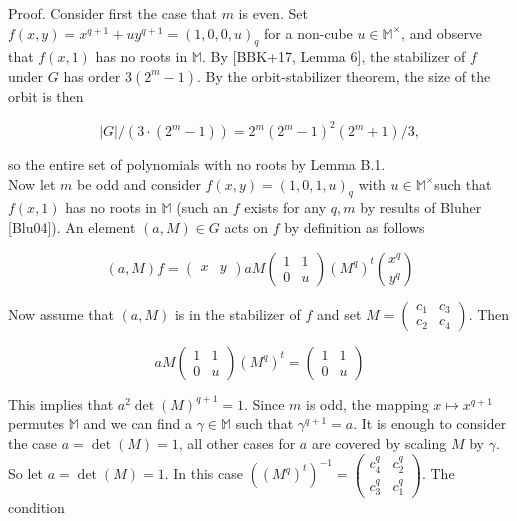 \documentclass[10pt]{article}
\begin{document}
Proof. Consider first the case that $m$ is even. Set $f(x, y)=x^{q+1}+u y^{q+1}=(1,0,0, u)_{q}$ for a non-cube $u \in \mathbb{M}^{\times}$, and observe that $f(x, 1)$ has no roots in $\mathbb{M}$. By [BBK+17, Lemma 6], the stabilizer of $f$ under $G$ has order $3\left(2^{m}-1\right)$. By the orbit-stabilizer theorem, the size of the orbit is then

$$
|G| /\left(3 \cdot\left(2^{m}-1\right)\right)=2^{m}\left(2^{m}-1\right)^{2}\left(2^{m}+1\right) / 3,
$$

so the entire set of polynomials with no roots by Lemma B.1.\\
Now let $m$ be odd and consider $f(x, y)=(1,0,1, u)_{q}$ with $u \in \mathbb{M}^{\times}$such that $f(x, 1)$ has no roots in $\mathbb{M}$ (such an $f$ exists for any $q, m$ by results of Bluher [Blu04]). An element $(a, M) \in G$ acts on $f$ by definition as follows

$$
(a, M) f=\left(\begin{array}{ll}
x & y
\end{array}\right) a M\left(\begin{array}{ll}
1 & 1 \\
0 & u
\end{array}\right)\left(M^{q}\right)^{t}\binom{x^{q}}{y^{q}}
$$

Now assume that $(a, M)$ is in the stabilizer of $f$ and set $M=\left(\begin{array}{ll}c_{1} & c_{3} \\ c_{2} & c_{4}\end{array}\right)$. Then

$$
a M\left(\begin{array}{ll}
1 & 1 \\
0 & u
\end{array}\right)\left(M^{q}\right)^{t}=\left(\begin{array}{ll}
1 & 1 \\
0 & u
\end{array}\right)
$$

This implies that $a^{2} \operatorname{det}(M)^{q+1}=1$. Since $m$ is odd, the mapping $x \mapsto x^{q+1}$ permutes $\mathbb{M}$ and we can find a $\gamma \in \mathbb{M}$ such that $\gamma^{q+1}=a$. It is enough to consider the case $a=\operatorname{det}(M)=1$, all other cases for $a$ are covered by scaling $M$ by $\gamma$. So let $a=\operatorname{det}(M)=1$. In this case $\left(\left(M^{q}\right)^{t}\right)^{-1}=\left(\begin{array}{ll}c_{4}^{q} & c_{2}^{q} \\ c_{3}^{q} & c_{1}^{q}\end{array}\right)$. The condition
\end{document}
